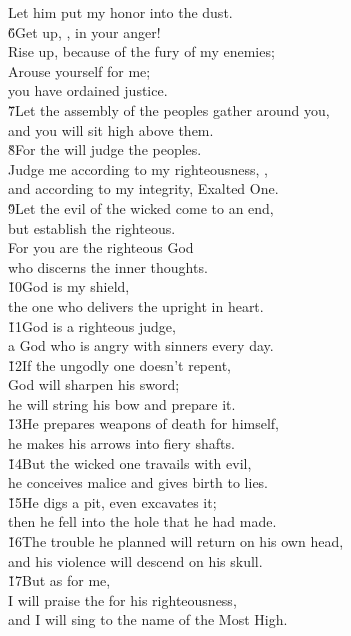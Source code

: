 \begin{poetry}
\poeml Let him put my honor into the dust. \\
\poeml \v{6}Get up, , in your anger! \\
\poemll    Rise up, because of the fury of my enemies; \\
\poeml Arouse yourself for me; \\
\poemll    you have ordained justice. \\
\poeml \v{7}Let the assembly of the peoples gather around you, \\
\poemll    and you will sit high above them. \\
\poeml \v{8}For the  will judge the peoples. \\
\poemll    Judge me according to my righteousness, , \\
\poemlll       and according to my integrity, Exalted One. \\
\poeml \v{9}Let the evil of the wicked come to an end, \\
\poemll    but establish the righteous. \\
\poeml For you are the righteous God \\
\poemll    who discerns the inner thoughts. \\
\poeml \v{10}God is my shield, \\
\poemll    the one who delivers the upright in heart. \\
\poeml \v{11}God is a righteous judge, \\
\poemll    a God who is angry with sinners every day. \\
\poeml \v{12}If the ungodly one doesn't repent, \\
\poemll    God will sharpen his sword; \\
\poemlll       he will string his bow and prepare it. \\
\poeml \v{13}He prepares weapons of death for himself, \\
\poemll    he makes his arrows into fiery shafts. \\
\poeml \v{14}But the wicked one travails with evil, \\
\poemll    he conceives malice and gives birth to lies. \\
\poeml \v{15}He digs a pit, even excavates it; \\
\poemll    then he fell into the hole that he had made. \\
\poeml \v{16}The trouble he planned will return on his own head, \\
\poemll    and his violence will descend on his skull. \\
\poeml \v{17}But as for me, \\
\poemll    I will praise the  for his righteousness, \\
\poemlll       and I will sing to the name of the  Most High.
\end{poetry}
